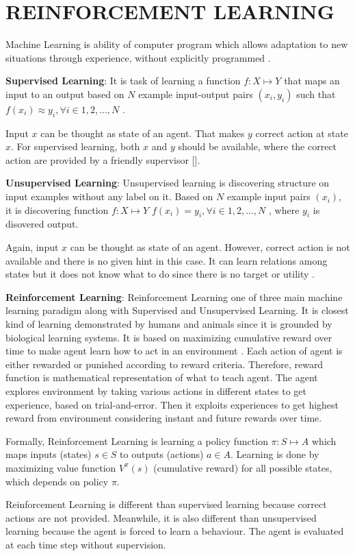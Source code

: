 \chapter{REINFORCEMENT LEARNING}

\label{chap:rl_chap}

Machine Learning is ability of computer program which allows adaptation to new situations through experience, without explicitly programmed \cite{mitchell_machine_1997}.

\textbf{Supervised Learning}: It is task of learning a function $f \colon X \mapsto Y$ that maps an input to an output based on $N$ example input-output pairs $(x_i,y_i)$ such that $ f(x_i) \approx y_i, \forall i \in {1,2,...,N} $ \cite{russell_artificial_nodate}.

Input $x$ can be thought as state of an agent. That makes $y$ correct action at state $x$. For supervised learning, both $x$ and $y$ should be available, where the correct action are provided by a friendly supervisor []. 

\textbf{Unsupervised Learning}:
Unsupervised learning is discovering structure on input examples without any label on it. Based on $N$ example input pairs $(x_i)$, it is discovering function $f \colon X \mapsto Y$ $ f(x_i) = y_i, \forall i \in {1,2,...,N} $ , where $y_i$ is disovered output. 

Again, input $x$ can be thought as state of an agent. However, correct action is not available and there is no given hint in this case. It can learn relations among states but it does not know what to do since there is no target or utility \cite{russell_artificial_nodate}.

\textbf{Reinforcement Learning}: Reinforcement Learning one of three main machine learning paradigm along with Supervised and Unsupervised Learning. It is closest kind of learning demonstrated by humans and animals since it is grounded by biological learning systems. It is based on maximizing cumulative reward over time to make agent learn how to act in an environment \cite{sutton_reinforcement_1998}. Each action of agent is either rewarded or punished according to reward criteria. Therefore, reward function is mathematical representation of what to teach agent. The agent explores environment by taking various actions in different states to get experience, based on trial-and-error. Then it exploits experiences to get highest reward from environment considering instant and future rewards over time. 

Formally, Reinforcement Learning is learning a policy function $\pi \colon S \mapsto A$ which maps inputs (states) $s \in S$ to outputs (actions) $a \in A$. Learning is done by maximizing value function $V^{\pi}(s)$ (cumulative reward) for all possible states, which depends on policy $\pi$. 

Reinforcement Learning is different than supervised learning because correct actions are not provided. Meanwhile, it is also different than unsupervised learning because the agent is forced to learn a behaviour. The agent is evaluated at each time step without supervision.
